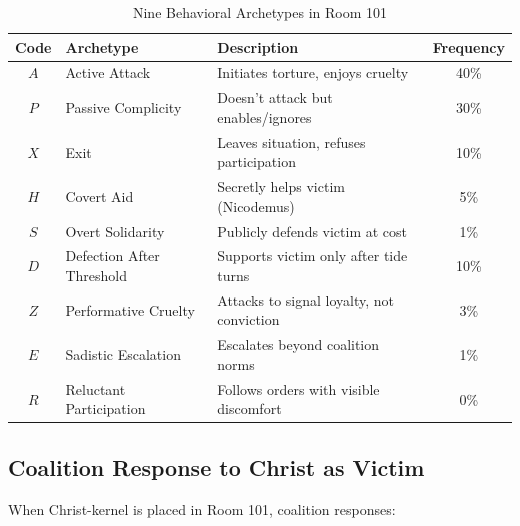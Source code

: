 \documentclass[11pt,a4paper]{article}
\theoremstyle{definition}
\theoremstyle{remark}
\begin{document}
\begin{table}[H]
\centering
\caption{Nine Behavioral Archetypes in Room 101}
\label{tab:archetypes}
\begin{tabular}{@{}clp{5cm}c@{}}
\toprule
\textbf{Code} & \textbf{Archetype} & \textbf{Description} & \textbf{Frequency} \\
\midrule
$A$ & Active Attack & Initiates torture, enjoys cruelty & 40\% \\
$P$ & Passive Complicity & Doesn't attack but enables/ignores & 30\% \\
$X$ & Exit & Leaves situation, refuses participation & 10\% \\
$H$ & Covert Aid & Secretly helps victim (Nicodemus) & 5\% \\
$S$ & Overt Solidarity & Publicly defends victim at cost & 1\% \\
$D$ & Defection After Threshold & Supports victim only after tide turns & 10\% \\
$Z$ & Performative Cruelty & Attacks to signal loyalty, not conviction & 3\% \\
$E$ & Sadistic Escalation & Escalates beyond coalition norms & 1\% \\
$R$ & Reluctant Participation & Follows orders with visible discomfort & 0\% \\
\bottomrule
\end{tabular}
\end{table}

\subsection{Coalition Response to Christ as Victim}

When Christ-kernel is placed in Room 101, coalition responses:
\end{document}
